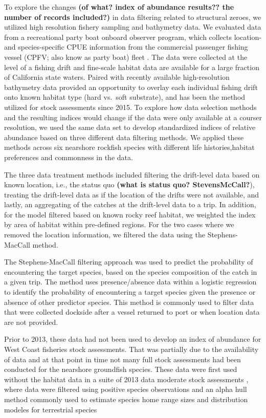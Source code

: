 \documentclass[
  authoryear,
  preprint,
  3p]{elsarticle}
\begin{document}
To explore the changes \textbf{(of what? index of abundance results??
the number of records included?)} in data filtering related to
structural zeroes, we utilized high resolution fishery sampling and
bathymetry data. We evaluated data from a recreational party boat
onboard observer program, which collects location- and species-specific
CPUE information from the commercial passenger fishing vessel (CPFV;
also know as party boat) fleet \citep{Monk:2014:DRD}. The data were
collected at the level of a fishing drift and fine-scale habitat data
are available for a large fraction of California state waters. Paired
with recently available high-resolution bathymetry data provided an
opportunity to overlay each individual fishing drift onto known habitat
type (hard vs.~soft substrate), and has been the method utilized for
stock assessments since 2015. To explore how data selection methods and
the resulting indices would change if the data were only available at a
courser resolution, we used the same data set to develop standardized
indices of relative abundance based on three different data filtering
methods. We applied these methods across six nearshore rockfish species
with different life histories,habitat preferences and commonness in the
data.

The three data treatment methods included filtering the drift-level data
based on known location, i.e., the status quo \textbf{(what is status
quo? StevensMcCall?}), treating the drift-level data as if the location
of the drifts were not available, and lastly, an aggregating of the
catches at the drift-level data to a trip. In addition, for the model
filtered based on known rocky reef habitat, we weighted the index by
area of habitat within pre-defined regions. For the two cases where we
removed the location information, we filtered the data using the
Stephens-MacCall method.

The Stephens-MacCall \citeyearpar{Stephens:2004:MAS} filtering approach
was used to predict the probability of encountering the target species,
based on the species composition of the catch in a given trip. The
method uses presence/absence data within a logistic regression to
identify the probability of encountering a target species given the
presence or absence of other predictor species. This method is commonly
used to filter data that were collected dockside after a vessel returned
to port or when location data are not provided.

Prior to 2013, these data had not been used to develop an index of
abundance for West Coast fisheries stock assessments. That was partially
due to the availability of data and at that point in time not many full
stock assessments had been conducted for the nearshore groundfish
species. These data were first used without the habitat data in a suite
of 2013 data moderate stock assessments \citep{Cope:2015:DMS}, where
data were filtered using positive species observations and an alpha hull
method commonly used to estimate species home range sizes and
distribution modeles for terrestrial species
\citep{Burgman:2003:BSR, Meyer:2017:CHM}
\end{document}
